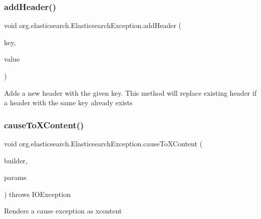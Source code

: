 \subsubsection{\texorpdfstring{add\+Header()}{addHeader()}\hspace{0.1cm}{\footnotesize\ttfamily [2/2]}}
{\footnotesize\ttfamily void org.\+elasticsearch.\+Elasticsearch\+Exception.\+add\+Header (\begin{DoxyParamCaption}\item[{String}]{key,  }\item[{List$<$ String $>$}]{value }\end{DoxyParamCaption})}

Adds a new header with the given key. This method will replace existing header if a header with the same key already exists \hypertarget{classorg_1_1elasticsearch_1_1_elasticsearch_exception_a0213b3882cf8a48f095b86df44951a96}{}\label{classorg_1_1elasticsearch_1_1_elasticsearch_exception_a0213b3882cf8a48f095b86df44951a96} 
\subsubsection{\texorpdfstring{cause\+To\+X\+Content()}{causeToXContent()}}
{\footnotesize\ttfamily void org.\+elasticsearch.\+Elasticsearch\+Exception.\+cause\+To\+X\+Content (\begin{DoxyParamCaption}\item[{X\+Content\+Builder}]{builder,  }\item[{Params}]{params }\end{DoxyParamCaption}) throws I\+O\+Exception\hspace{0.3cm}{\ttfamily [protected]}}

Renders a cause exception as xcontent \hypertarget{classorg_1_1elasticsearch_1_1_elasticsearch_exception_a4c3811c41b21d6c6dc7d7f5d97042e95}{}\label{classorg_1_1elasticsearch_1_1_elasticsearch_exception_a4c3811c41b21d6c6dc7d7f5d97042e95} 
